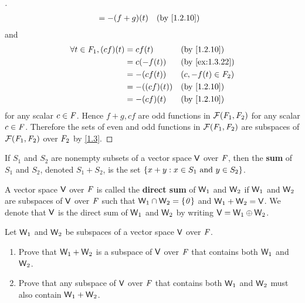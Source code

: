 \begin{proof}[]
\begin{align*}
                                   & = -(f + g)(t)    &  & \by{1.2.10}
  \end{align*}
  and
  \begin{align*}
    \forall t \in \F_1, (cf)(t) & = cf(t)      &  & \by{1.2.10}         \\
                                & = c(-f(t))   &  & \by{ex:1.3.22}      \\
                                & = -(cf(t))   &  & (c, -f(t) \in \F_2) \\
                                & = -((cf)(t)) &  & \by{1.2.10}         \\
                                & = -(cf)(t)   &  & \by{1.2.10}
  \end{align*}
  for any scalar \(c \in \mathit{F}\).
  Hence \(f + g, cf\) are odd functions in \(\mathcal{F}(\mathit{F}_1, \mathit{F}_2)\) for any scalar \(c \in \mathit{F}\).
  Therefore the sets of even and odd functions in \(\mathcal{F}(\mathit{F}_1, \mathit{F}_2)\) are subspaces of \(\mathcal{F}(\mathit{F}_1, \mathit{F}_2)\) over \(\mathit{F}_2\) by \cref{1.3}.
\end{proof}

\begin{defn}\label{1.3.10}
  If \(S_1\) and \(S_2\) are nonempty subsets of a vector space \(\mathsf{V}\) over \(\mathit{F}\), then the \textbf{sum} of \(S_1\) and \(S_2\), denoted \(S_1 + S_2\), is the set \(\left\lbrace x + y : x \in S_1 \text{ and } y \in S_2\right\rbrace\).
\end{defn}

\begin{defn}\label{1.3.11}
  A vector space \(\mathsf{V}\) over \(\mathit{F}\) is called the \textbf{direct sum} of \(\mathsf{W}_1\) and \(\mathsf{W}_2\) if \(\mathsf{W}_1\) and \(\mathsf{W}_2\) are subspaces of \(\mathsf{V}\) over \(\mathit{F}\) such that \(\mathsf{W}_1 \cap \mathsf{W}_2 = \left\lbrace\mathit{0}\right\rbrace\) and \(\mathsf{W}_1 + \mathsf{W}_2 = \mathsf{V}\).
  We denote that \(\mathsf{V}\) is the direct sum of \(\mathsf{W}_1\) and \(\mathsf{W}_2\) by writing \(\mathsf{V} = \mathsf{W}_1 \oplus \mathsf{W}_2\).
\end{defn}

\begin{ex}\label{ex:1.3.23}
  Let \(\mathsf{W}_1\) and \(\mathsf{W}_2\) be subspaces of a vector space \(\mathsf{V}\) over \(\mathit{F}\).
  \begin{enumerate}
    \item Prove that \(\mathsf{W}_1 + \mathsf{W}_2\) is a subspace of \(\mathsf{V}\) over \(\mathit{F}\) that contains both \(\mathsf{W}_1\) and \(\mathsf{W}_2\).
    \item Prove that any subspace of \(\mathsf{V}\) over \(\mathit{F}\) that contains both \(\mathsf{W}_1\) and \(\mathsf{W}_2\) must also contain \(\mathsf{W}_1 + \mathsf{W}_2\).
  \end{enumerate}
\end{ex}

